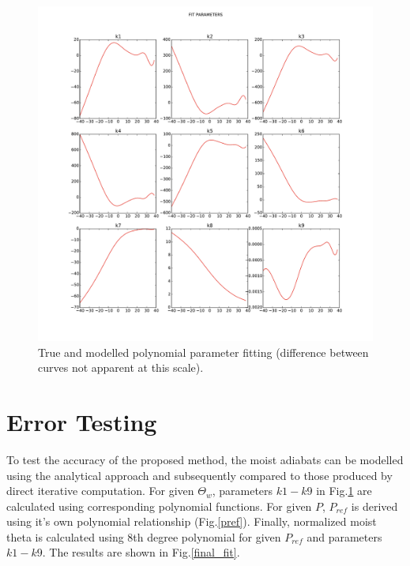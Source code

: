 \documentclass{article}
\begin{document}
\begin{figure}
\centering
\includegraphics[width=7in]{../figs/fit_params.pdf}
\caption{True and modelled polynomial parameter fitting (difference between curves not apparent at this scale).}\label{fit_params}
\end{figure}

\FloatBarrier

\section*{Error Testing}

To test the accuracy of the proposed method, the moist adiabats can be modelled using the analytical approach and subsequently compared to those produced by direct iterative computation. For given $\Theta_w$, parameters $k1-k9$ in Fig.\ref{fit_params} are calculated using corresponding polynomial functions. For given $P$, $P_{ref}$ is derived using it's own polynomial relationship (Fig.\ref{pref}). Finally, normalized moist theta is calculated using 8th degree polynomial for given $P_{ref}$ and parameters $k1-k9$. The results are shown in Fig.\ref{final_fit}.
\end{document}
